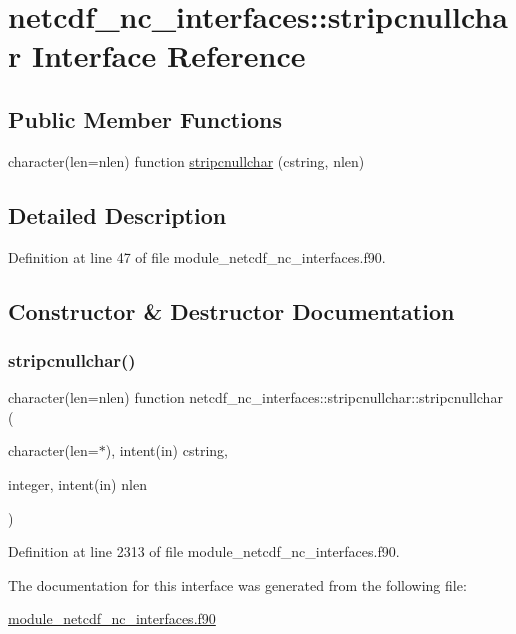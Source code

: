 \hypertarget{interfacenetcdf__nc__interfaces_1_1stripcnullchar}{}\section{netcdf\+\_\+nc\+\_\+interfaces\+:\+:stripcnullchar Interface Reference}
\label{interfacenetcdf__nc__interfaces_1_1stripcnullchar}
\subsection*{Public Member Functions}
\begin{DoxyCompactItemize}
\item 
character(len=nlen) function \hyperlink{interfacenetcdf__nc__interfaces_1_1stripcnullchar_a8c669b4ca05bbf8af0d33b7d6af05352}{stripcnullchar} (cstring, nlen)
\end{DoxyCompactItemize}


\subsection{Detailed Description}


Definition at line 47 of file module\+\_\+netcdf\+\_\+nc\+\_\+interfaces.\+f90.



\subsection{Constructor \& Destructor Documentation}
\mbox{\label{interfacenetcdf__nc__interfaces_1_1stripcnullchar_a8c669b4ca05bbf8af0d33b7d6af05352}} 
\subsubsection{\texorpdfstring{stripcnullchar()}{stripcnullchar()}}
{\footnotesize\ttfamily character(len=nlen) function netcdf\+\_\+nc\+\_\+interfaces\+::stripcnullchar\+::stripcnullchar (\begin{DoxyParamCaption}\item[{character(len=$\ast$), intent(in)}]{cstring,  }\item[{integer, intent(in)}]{nlen }\end{DoxyParamCaption})}



Definition at line 2313 of file module\+\_\+netcdf\+\_\+nc\+\_\+interfaces.\+f90.



The documentation for this interface was generated from the following file\+:\begin{DoxyCompactItemize}
\item 
\hyperlink{module__netcdf__nc__interfaces_8f90}{module\+\_\+netcdf\+\_\+nc\+\_\+interfaces.\+f90}\end{DoxyCompactItemize}
